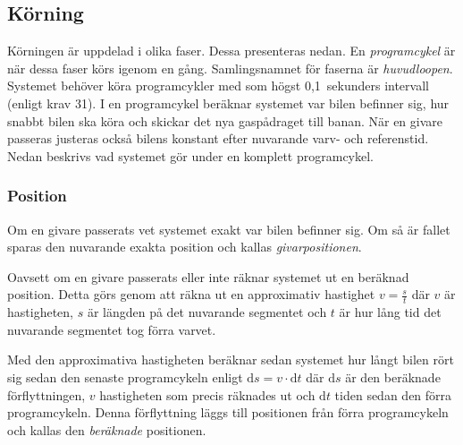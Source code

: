 \subsection{Körning}
\label{sec:systembeskrivning:korning}

Körningen är uppdelad i olika faser. Dessa presenteras nedan. En
\emph{programcykel} är när dessa faser körs igenom en gång. Samlingsnamnet för
faserna är \emph{huvudloopen}. Systemet behöver köra programcykler med som högst
0,1~sekunders intervall (enligt krav 31). I en programcykel beräknar systemet
var bilen befinner sig, hur snabbt bilen ska köra och skickar det nya
gaspådraget till banan. När en givare passeras justeras också bilens konstant
efter nuvarande varv- och referenstid.  Nedan beskrivs vad systemet gör under en
komplett programcykel.

\subsubsection{Position}
\label{sec:system:korning:position}

Om en givare passerats vet systemet exakt var bilen befinner sig. Om så är
fallet sparas den nuvarande exakta position och kallas \emph{givarpositionen}.


Oavsett om en givare passerats eller inte räknar systemet ut en beräknad
position. Detta görs genom att räkna ut en approximativ hastighet $v =
\frac{s}{t}$ där $v$ är hastigheten, $s$ är längden på det nuvarande segmentet
och $t$ är hur lång tid det nuvarande segmentet tog förra varvet.


Med den approximativa hastigheten beräknar sedan systemet hur långt bilen rört
sig sedan den senaste programcykeln enligt $\mathrm{d}s = v \cdot \mathrm{d}t$
där $\mathrm{d}s$ är den beräknade förflyttningen, $v$ hastigheten som precis
räknades ut och $\mathrm{d}t$ tiden sedan den förra programcykeln. Denna
förflyttning läggs till positionen från förra programcykeln och kallas den
\emph{beräknade} positionen.

